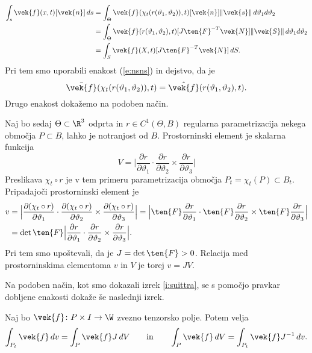 \proof
	\begin{align*}
		\int_s\vek{f}(x,t)[\vek{n}]\,ds&=
		\int_{\Theta}\vek{f}(\chi_t(r(\vartheta_1,\vartheta_2)),t)
		[\vek{n}]\|\vek{s}\|\,d\vartheta_1d\vartheta_2\\
		&=\int_{\Theta}\vek{f}(r(\vartheta_1,\vartheta_2),t)
		[J\ten{F}^{-T}\vek{N}]\|\vek{S}\|\,d\vartheta_1d\vartheta_2\\
		&=\int_S\vek{f}(X,t)[J\ten{F}^{-T}\vek{N}]\,dS.
	\end{align*}
	Pri tem smo uporabili enakost (\ref{e:nsns}) in dejstvo, da je
	\[ \bar{\vek{f}}(\chi_t(r(\vartheta_1,\vartheta_2)),t)=\hat{\vek{f}}(r(\vartheta_1,\vartheta_2),t). \]
	Drugo enakost dokažemo na podoben način.
\endproof

Naj bo sedaj $\Theta\subset\R^3$ odprta in $r\in C^1(\Theta,B)$ regularna parametrizacija
nekega območja $P\subset B$, lahko je notranjost od $B$. Prostorninski element je
skalarna funkcija
\[
	V=\Big|\frac{\partial r}{\partial\vartheta_1}\cdot
	\frac{\partial r}{\partial\vartheta_2}\times\frac{\partial r}{\partial\vartheta_3}\Big|
\]
Preslikava $\chi_t\circ r$ je v tem primeru parametrizacija območja $P_t=\chi_t(P)\subset B_t$.
Pripadajoči prostorninski element je
\begin{align*}
	v&=\Big|\frac{\partial(\chi_t\circ r)}{\partial\vartheta_1}\cdot
	\frac{\partial(\chi_t\circ r)}{\partial\vartheta_2}\times\frac{\partial(\chi_t\circ r)}{\partial\vartheta_3}\Big|
	=\Big|\ten{F}\frac{\partial r}{\partial\vartheta_1}\cdot
	\ten{F}\frac{\partial r}{\partial\vartheta_2}\times\ten{F}\frac{\partial r}{\partial\vartheta_3}\Big| \\
	&=\det\ten{F}\Big|\frac{\partial r}{\partial\vartheta_1}\cdot
	\frac{\partial r}{\partial\vartheta_2}\times\frac{\partial r}{\partial\vartheta_3}\Big|.
\end{align*}
Pri tem smo upoštevali, da je $J=\det\ten{F}>0$.
Relacija med prostorninskima elementoma $v$ in $V$ je torej $v=JV$.

Na podoben način, kot smo dokazali izrek \ref{i:suittra}, se s pomočjo pravkar dobljene
enakosti dokaže še naslednji izrek.
\begin{izrek} \label{i:prointrel}
	Naj bo $\vek{f}\colon P\times I\to\W$ zvezno tenzorsko polje. Potem velja
	\begin{equation*}
		\int_{P_t}\vek{f}\,dv=\int_P\vek{f}J\,dV \qquad\textrm{in}\qquad
		\int_P\vek{f}\,dV=\int_{P_t}\vek{f}J^{-1}\,dv.
	\end{equation*}
\end{izrek}


